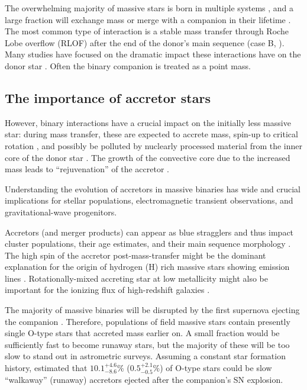 \documentclass[twocolumn,twocolappendix,trackchanges]{aastex63}
\newcommand{\todo}[1]{{\large $\blacksquare$~\textbf{\color{red}[#1]}}~$\blacksquare$}
\begin{document}
The overwhelming majority of massive stars is born in multiple systems
\citep[e.g.,][]{mason:09, almeida:17}, and a large fraction will
exchange mass or merge with a companion in their lifetime
\citep[e.g.,][]{sana:12}. The most common type of interaction is a
stable mass transfer through Roche Lobe overflow (RLOF) after the end of the donor's main sequence (case
B, \citealt{kippenhahn:67}).  Many
studies %
have focused on the dramatic impact these interactions have on the
donor star \citep[e.g.,][]{morton:60, yoon:17, gotberg:17, gotberg:18, laplace:20,
  laplace:21, blagorodnova:21}. Often the binary companion is treated as a point mass.

\subsection{The importance of accretor stars}

However, binary interactions have a crucial impact on the initially
less massive star: %
during mass transfer, these are expected to
accrete mass, spin-up to critical rotation
\citep[e.g.,][]{packet:81}, and possibly be polluted by
nuclearly processed material from the inner core of the donor star
\citep[e.g.,][]{blaauw:93}. The growth of
the convective core due to the increased mass leads to
``rejuvenation'' of the accretor \citep[e.g.,][]{neo:77, schneider:16}.

Understanding the evolution of accretors in massive binaries has wide
and crucial implications for stellar populations, electromagnetic
transient observations, and gravitational-wave progenitors.

Accretors
(and merger products) can appear as blue stragglers
\citep[e.g.,][]{chen:09, chen:10, rain:21} and thus impact cluster
populations, their age estimates, and their main sequence morphology
\citep[e.g.,][]{pols_marinus:94, wang:20}. The high spin of the
accretor post-mass-transfer might be the dominant explanation for the origin of
hydrogen (H) rich massive stars showing emission lines \citep[e.g.,][]{bodensteiner:20,
  vinciguerra:20}. Rotationally-mixed accreting
star at low metallicity might also be important for the ionizing flux of high-redshift
galaxies \citep[e.g.,][]{eldridge:12}.

The majority of massive binaries will be
disrupted by the first supernova ejecting the companion
\citep[``binary SN scenario'', ][]{blaauw:61, dedonder:97,
  eldridge:11, boubert:18, renzo:19walk, evans:20}. Therefore,
populations of field massive stars contain presently single O-type
stars that accreted mass earlier on. A small fraction would be
sufficiently fast to become runaway stars, but the majority of these will be too
slow to stand out in astrometric surveys. Assuming a constant star
formation history, \cite{renzo:19walk} estimated that
$10.1^{+4.6}_{-8.6}\%$ ($0.5^{+2.1}_{-0.5}\%$) of O-type stars could
be slow ``walkaway'' (runaway) accretors
ejected after the companion's SN explosion.
\end{document}
